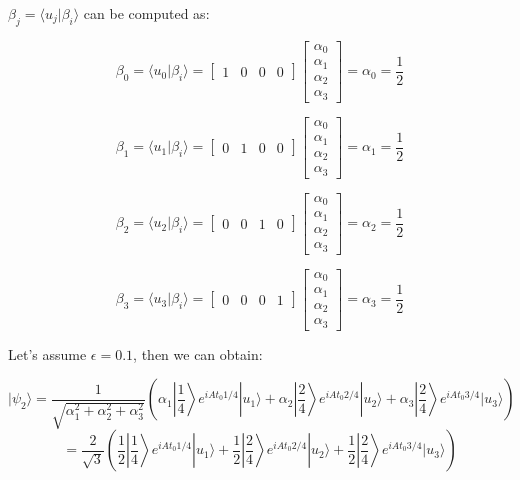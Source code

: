 \documentclass[12pt]{article}
\begin{document}
$\beta_j = \langle u_{j}|\beta_i\rangle$ can be computed as:

$$
\beta_0 = \langle u_{0}|\beta_i\rangle = \begin{bmatrix}
1 & 0 & 0 & 0
\end{bmatrix}
\begin{bmatrix}
\alpha_0 \\
\alpha_1 \\
\alpha_2 \\
\alpha_3
\end{bmatrix} = \alpha_0=\frac{1}{2}
$$

$$
\beta_1 = \langle u_{1}|\beta_i\rangle = \begin{bmatrix}
0 & 1 & 0 & 0
\end{bmatrix}
\begin{bmatrix}
\alpha_0 \\
\alpha_1 \\
\alpha_2 \\
\alpha_3
\end{bmatrix} = \alpha_1=\frac{1}{2}
$$

$$
\beta_2 = \langle u_{2}|\beta_i\rangle = \begin{bmatrix}
0 & 0 & 1 & 0
\end{bmatrix}
\begin{bmatrix}
\alpha_0 \\
\alpha_1 \\
\alpha_2 \\
\alpha_3
\end{bmatrix} = \alpha_2=\frac{1}{2}
$$

$$
\beta_3 = \langle u_{3}|\beta_i\rangle = \begin{bmatrix}
0 & 0 & 0 & 1
\end{bmatrix}
\begin{bmatrix}
\alpha_0 \\
\alpha_1 \\
\alpha_2 \\
\alpha_3
\end{bmatrix} = \alpha_3=\frac{1}{2}
$$

Let's assume $\epsilon=0.1$, then we can obtain:

$$
|\psi_{2}\rangle
= \frac{1}{\sqrt{\alpha_1^2 + \alpha_2^2 + \alpha_3^2}} \left(\alpha_1\left|\frac{1}{4}\right\rangle e^{i A t_{0} 1/4} |u_{1}\rangle + \alpha_2\left|\frac{2}{4}\right\rangle e^{i A t_{0} 2/4} |u_{2}\rangle +  \alpha_3\left|\frac{2}{4}\right\rangle e^{i A t_{0} 3/4} |u_{3}\rangle\right)
$$
$$
= \frac{2}{\sqrt{3}}\left(\frac{1}{2}\left|\frac{1}{4}\right\rangle e^{i A t_{0} 1/4} |u_{1}\rangle + \frac{1}{2}\left|\frac{2}{4}\right\rangle e^{i A t_{0} 2/4} |u_{2}\rangle +  \frac{1}{2}\left|\frac{2}{4}\right\rangle e^{i A t_{0} 3/4} |u_{3}\rangle\right)
$$
\end{document}
